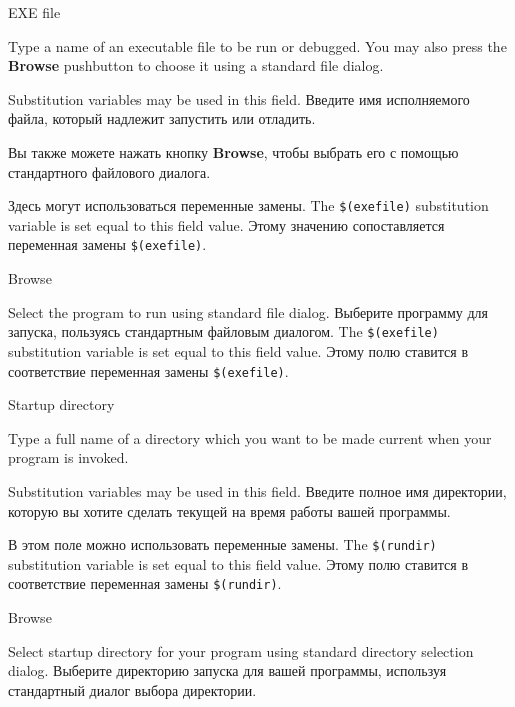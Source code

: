 \begin{popup}
\caption{EXE file}

\ifenglish
Type a name of an executable file to be run or debugged.
You may also press the {\bf Browse} pushbutton to choose it using
a standard file dialog.

Substitution variables may be used in this field.
 \else
Введите имя исполняемого файла, который надлежит запустить или отладить.

Вы также можете нажать кнопку {\bf Browse}, чтобы выбрать его с помощью
стандартного файлового диалога.

Здесь могут использоваться переменные замены.
\fi
\ifenglish
The \verb'$(exefile)' substitution variable is set equal to this field value.
\else
Этому значению сопоставляется переменная замены \verb'$(exefile)'.
\fi
\end{popup}

\begin{popup}
\caption{Browse}

\ifenglish
Select the program to run using standard file dialog.
 \else
Выберите программу для запуска, пользуясь стандартным файловым диалогом.
\fi
\ifenglish
The \verb'$(exefile)' substitution variable is set equal to this field value.
 \else
Этому полю ставится в соответствие переменная замены \verb'$(exefile)'.
\fi
\end{popup}
\begin{popup}
\caption{Startup directory}

\ifenglish
Type a full name of a directory which you want to be made current when
your program is invoked.

Substitution variables may be used in this field.
 \else
Введите полное имя директории, которую вы хотите сделать текущей на время
работы вашей программы.

В этом поле можно использовать переменные замены.
\fi
\ifenglish
The \verb'$(rundir)' substitution variable is set equal to this field value.
 \else
Этому полю ставится в соответствие переменная замены \verb'$(rundir)'. 
\fi
\end{popup}

\begin{popup}
\caption{Browse}

\ifenglish
Select startup directory for your program using standard directory
selection dialog.
 \else
Выберите директорию запуска для вашей программы, используя стандартный 
диалог выбора директории.
\fi
\end{popup}

